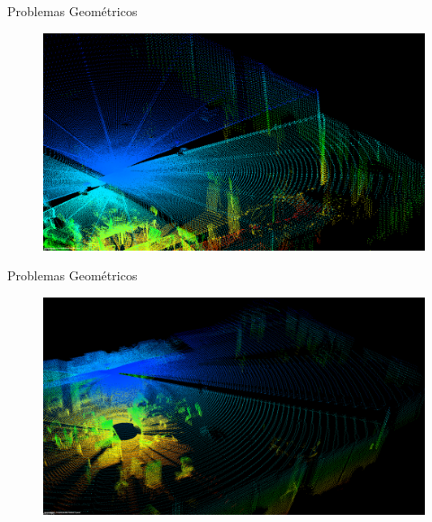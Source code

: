 \begin{frame}{Problemas Geométricos}

    \begin{figure}
        \centering
        \includegraphics[width=1\textwidth]{img/geometric_errors_1.png}
    \end{figure}
    
\end{frame}

\begin{frame}{Problemas Geométricos}

    \begin{figure}
        \centering
        \includegraphics[width=1\textwidth]{img/geometric_errors_2.png}
    \end{figure}
    
\end{frame}

